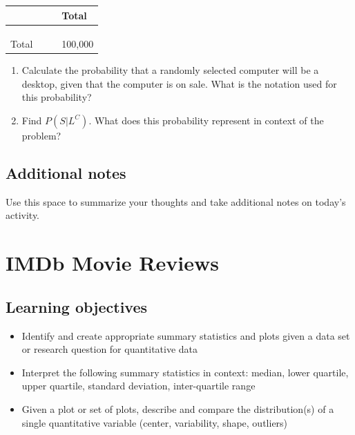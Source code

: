 \documentclass[
]{report}
\begin{document}
\begin{longtable}[]{@{}llll@{}}
\toprule
\hspace{1in} & \hspace{1in} & \hspace{1in} & Total\tabularnewline
\midrule
\endhead
\hspace{1in} & & &\tabularnewline
\hspace{1in} & & &\tabularnewline
\hspace{1in} & & &\tabularnewline
Total & & & 100,000\tabularnewline
\bottomrule
\end{longtable}

\begin{enumerate}
\def\labelenumi{\alph{enumi}.}
\setcounter{enumi}{2}
\item
  Calculate the probability that a randomly selected computer will be a desktop, given that the computer is on sale. What is the notation used for this probability?
  \vspace{1in}
\item
  Find \(P(S | L^C)\). What does this probability represent in context of the problem?
  \vspace{1in}
\end{enumerate}

\hypertarget{additional-notes}{%
\section{Additional notes}\label{additional-notes}}

Use this space to summarize your thoughts and take additional notes on today's activity.

\hypertarget{imdb-movie-reviews}{%
\chapter{IMDb Movie Reviews}\label{imdb-movie-reviews}}

\hypertarget{learning-objectives}{%
\section{Learning objectives}\label{learning-objectives}}

\begin{itemize}
\item
  Identify and create appropriate summary statistics and plots
  given a data set or research question for quantitative data
\item
  Interpret the following summary statistics in context:
  median, lower quartile, upper quartile,
  standard deviation, inter-quartile range
\item
  Given a plot or set of plots, describe and compare the distribution(s)
  of a single quantitative variable
  (center, variability, shape, outliers)
\end{itemize}
\end{document}
